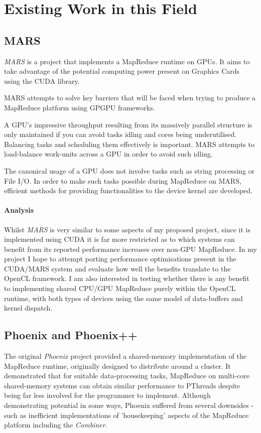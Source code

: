 \section{Existing Work in this Field}
\subsection{MARS}
\emph{MARS} \cite{mars} is a project that implements a MapReduce runtime on \ac{GPUs}. It aims to take advantage of the potential computing power present on Graphics Cards using the \ac{CUDA} library.

MARS attempts to solve key barriers that will be faced when trying to produce a MapReduce platform using \ac{GPGPU} frameworks.

    A GPU's impressive throughput resulting from its massively parallel structure is only maintained if you can avoid tasks idling and cores being underutilised. Balancing tasks and scheduling them effectively is important.
MARS attempts to load-balance work-units across a GPU in order to avoid such idling.

The canonical usage of a GPU does not involve tasks such as string processing or File I/O.
In order to make such tasks possible during MapReduce on MARS, efficient methods for providing functionalities to the device kernel are developed.
\paragraph{Analysis}
Whilst \emph{MARS} is very similar to some aspects of my proposed project, since it is implemented using \ac{CUDA} it is far more restricted as to which systems can benefit from its reported performance increases over non-GPU MapReduce. In my project I hope to attempt porting performance optimisations present in the \ac{CUDA}/MARS system and evaluate how well the benefits translate to the OpenCL framework. I am also interested in testing whether there is any benefit to implementing shared CPU/GPU MapReduce purely within the OpenCL runtime, with both types of devices using the same model of data-buffers and kernel dispatch.
\subsection{Phoenix and Phoenix++}
The original \emph{Phoenix} \cite{phoenix} project provided a shared-memory implementation of the MapReduce runtime, originally designed to distribute around a cluster. It demonstrated that for suitable data-processing tasks, MapReduce on multi-core shared-memory systems can obtain similar performance to PThreads despite being far less involved for the programmer to implement. Although demonstrating potential in some ways, Phoenix suffered from several downsides - such as inefficient implementations of 'housekeeping' aspects of the MapReduce platform including the \emph{Combiner}.

